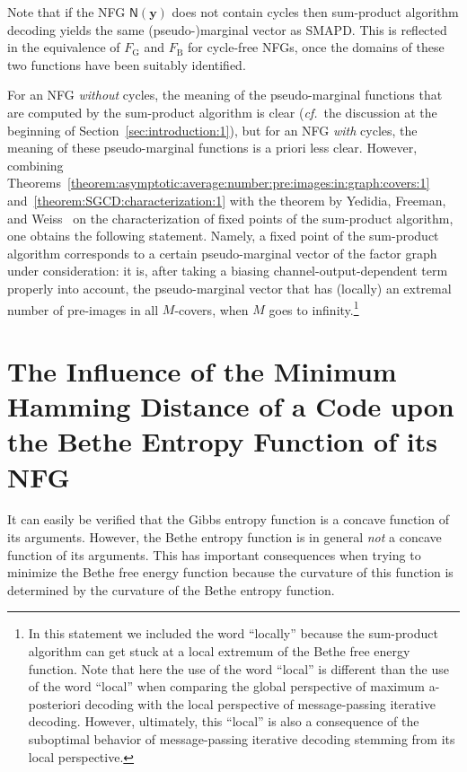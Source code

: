 \documentclass[journal, twocolumn]{IEEEtran}
\renewcommand{\mathbf}[1]{{\bm{#1}}}
\newcommand{\confer}{\emph{cf.}}
\newcommand{\vect}[1]{\mathbf{#1}}
\newcommand{\graph}[1]{\mathsf{#1}}
\newcommand{\vy}{\vect{y}}
\newcommand{\graphN}{\graph{N}}
\newcommand{\FBethe}{F_{\mathrm{B}}}
\newcommand{\?}{\mathrm{?}}
\newcommand{\FGibbs}{F_{\mathrm{G}}}
\begin{document}
Note that if the NFG $\graphN(\vy)$ does not contain cycles
then sum-product algorithm decoding yields the same (pseudo-)marginal vector
as SMAPD. This is reflected in the equivalence of $\FGibbs$ and $\FBethe$ for
cycle-free NFGs, once the domains of these two functions have
been suitably identified.


For an NFG \emph{without} cycles, the meaning of the pseudo-marginal functions
that are computed by the sum-product algorithm is clear (\confer~the
discussion at the beginning of Section~\ref{sec:introduction:1}), but for an
NFG \emph{with} cycles, the meaning of these pseudo-marginal functions is a
priori less clear. However, combining
Theorems~\ref{theorem:asymptotic:average:number:pre:images:in:graph:covers:1}
and~\ref{theorem:SGCD:characterization:1} with the theorem by Yedidia,
Freeman, and Weiss~\cite{Yedidia:Freeman:Weiss:05:1} on the characterization
of fixed points of the sum-product algorithm, one obtains the following
statement. Namely, a fixed point of the sum-product algorithm corresponds to a
certain pseudo-marginal vector of the factor graph under consideration: it is,
after taking a biasing channel-output-dependent term properly into account,
the pseudo-marginal vector that has (locally) an extremal number of pre-images
in all $M$-covers, when $M$ goes to infinity.\footnote{In this statement we
  included the word ``locally'' because the sum-product algorithm can get
  stuck at a local extremum of the Bethe free energy function. Note that here
  the use of the word ``local'' is different than the use of the word
  ``local'' when comparing the global perspective of maximum a-posteriori
  decoding with the local perspective of message-passing iterative
  decoding. However, ultimately, this ``local'' is also a consequence of the
  suboptimal behavior of message-passing iterative decoding stemming from its
  local perspective.}


\section{The Influence of the Minimum Hamming Distance
               of a Code upon the Bethe Entropy Function of 
                its NFG}
\label{sec:influence:minimum:Hamming:distance:1}


It can easily be verified that the Gibbs entropy function is a concave
function of its arguments. However, the Bethe entropy function is in general
\emph{not} a concave function of its arguments. This has important
consequences when trying to minimize the Bethe free energy function because
the curvature of this function is determined by the curvature of the Bethe
entropy function.
\end{document}
